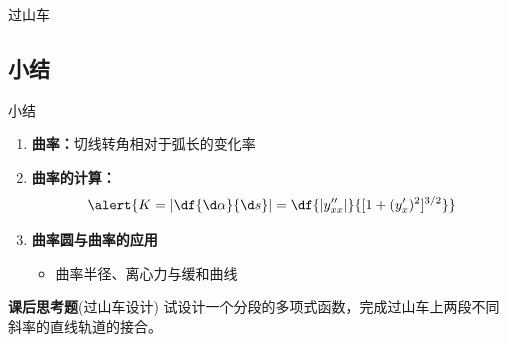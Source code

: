\begin{frame}{过山车}
	\linespread{1.2}
	\vspace{-1ex}
	\begin{center}
		\hspace{1em}
	\end{center}
\end{frame}

\subsection{小结}

\begin{frame}[<+->]{小结}
	\linespread{1.2}
	\begin{enumerate}
	  \item {\bf 曲率：}切线转角相对于弧长的变化率
	  \item {\bf 曲率的计算：}
	  $$\alert{K=\left|\df{\d\alpha}{\d s}\right|
				=\df{|y''_{xx}|}{[1+(y'_x)^2]^{3/2}}}$$
	  \item {\bf 曲率圆与曲率的应用}
	  \begin{itemize}
	    \item 曲率半径、离心力与缓和曲线
	  \end{itemize}
	\end{enumerate}
	\pause
	\begin{exampleblock}{{\bf 课后思考题}(过山车设计)\hfill}
		试设计一个分段的多项式函数，完成过山车上两段不同斜率的直线轨道的接合。
	\end{exampleblock}
\end{frame}

